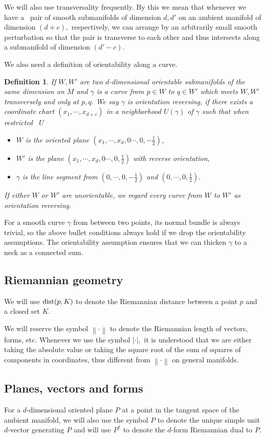 \documentclass[11pt,a4paper]{amsart}
\numberwithin{equation}{section}
\newcommand{\ga}{\gamma}
\newcommand{\cd}{\cdots}
\newcommand{\no}[1]{\left\lVert#1\right\rVert}
\theoremstyle{plain}
\newtheorem{defn}[exam]{Definition}
\theoremstyle{definition}
\numberwithin{equation}{subsection}
\begin{document}
	We will also use transversality \cite{MH} frequently. By this we mean that whenever we have a  pair of smooth submanifolds of dimension $d,d'$ on an ambient manifold of dimension $(d+c),$ respectively, we can arrange by an arbitrarily small smooth perturbation so that the pair is transverse to each other and thus intersects along a submanifold of dimension $(d'-c)$.	
	
	We also need a definition of orientability along a curve.
	\begin{defn}\label{defnor}If $W,W'$ are two $d$-dimensional orientable submanifolds of the same dimension on $M$ and $\ga$ is a curve from $p\in W$ to $q\in W'$ which meets $W,W'$ transversely and only at $p,q$. We say $\ga$ is orientation reversing, if there exists a coordinate chart $(x_1,\cd,x_{d+c})$ in a neighborhood $U(\ga)$ of $\ga$ such that when restricted  $U$
		\begin{itemize}
			\item $W$ is the oriented plane $(x_1,\cd,x_d,0\cd,0, -\frac{1}{2})$, 
			\item $W'$ is the plane $(x_1,\cd,x_d,0\cd,0, \frac{1}{2})$ with reverse orientation,
			\item $\ga$ is the line segment from $(0,\cd,0,-\frac{1}{2})$ and $(0,\cd,0,\frac{1}{2}).$
		\end{itemize} If either $W$ or $W'$ are unorientable, we regard every curve from $W$ to $W'$ as orientation reversing.
	\end{defn}For a smooth curve $\ga$ from between two points, its normal bundle is always trivial, so the above bullet conditions always hold if we drop the orientability assumptions. The orientability assumption ensures that we can thicken $\ga$ to a neck as a connected sum.
	\subsection{Riemannian geometry}\label{basrie}
	We will use $\textnormal{dist}(p,K)$ to denote the Riemannian distance between a point $p$ and a closed set $K.$ 
	
	We will reserve the symbol $\no{\cdot}$ to denote the Riemannian length of vectors, forms, etc. Whenever we use the symbol $|\cdot|,$ it is understood that we are either taking the absolute value or taking the square root of the sum of squares of components in coordinates, thus different from $\no{\cdot}$ on general manifolds.
	\subsection{Planes, vectors and forms}
	For a $d$-dimensional oriented plane $P$ at a point in the tangent space of the ambient manifold, we will also use the symbol $P$ to denote the unique simple unit $d$-vector generating $P$ and will use $P^\ast$ to denote the $d$-form Riemannian dual to $P.$ 
	
\end{document}
